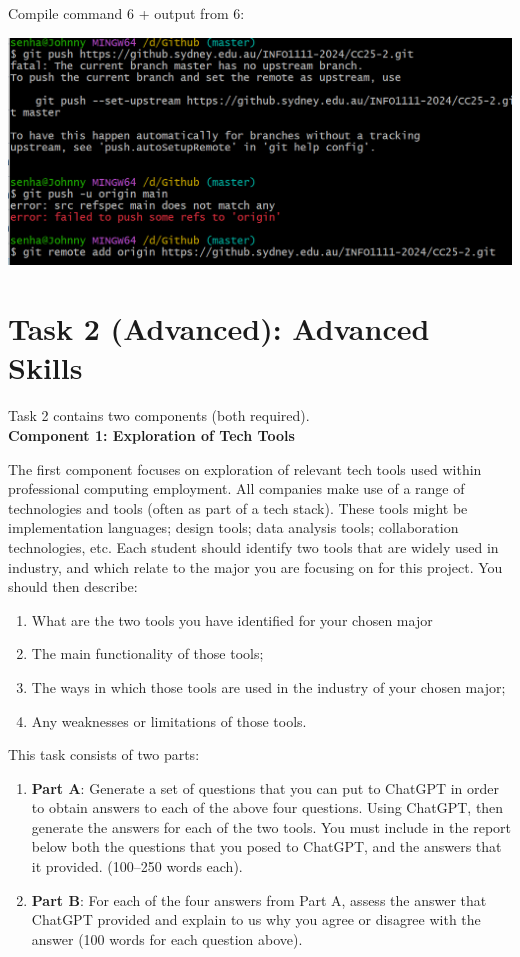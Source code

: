 \documentclass[a4paper, 11pt]{report}
\begin{document}
Compile command 6 + output from 6:

\includegraphics{graphic4}

\newpage
\section{Task 2 (Advanced): Advanced Skills}

Task 2 contains two components (both required).\\[2mm]

\textbf{Component 1: Exploration of Tech Tools}

The first component focuses on exploration of relevant tech tools used within professional computing employment. All companies make use of a range of technologies and tools (often as part of a tech stack). These tools might be implementation languages; design tools; data analysis tools; collaboration technologies, etc. Each student should identify two tools that are widely used in industry, and which relate to the major you are focusing on for this project. You should then describe:

\begin{enumerate}
\item What are the two tools you have identified for your chosen major
\item The main functionality of those tools;
\item The ways in which those tools are used in the industry of your chosen major;
\item Any weaknesses or limitations of those tools.
\end{enumerate}

This task consists of two parts:

\begin{enumerate}
\item \textbf{Part A}: Generate a set of questions that you can put to ChatGPT in order to obtain answers to each of the above four questions. Using ChatGPT, then generate the answers for each of the two tools. You must include in the report below both the questions that you posed to ChatGPT, and the answers that it provided.  (100–250 words each).
\item \textbf{Part B}: For each of the four answers from Part A, assess the answer that ChatGPT provided and explain to us why you agree or disagree with the answer (100 words for each question above).
\end{enumerate}
\end{document}
